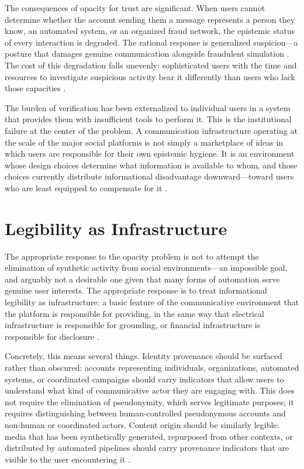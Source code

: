\documentclass[12pt,a4paper]{article}
\begin{document}
The consequences of opacity for trust are significant. When users cannot determine whether the
account sending them a message represents a person they know, an automated system, or an
organized fraud network, the epistemic status of every interaction is degraded. The rational
response is generalized suspicion---a posture that damages genuine communication alongside
fraudulent simulation \citep{boyd2014}. The cost of this degradation falls unevenly:
sophisticated users with the time and resources to investigate suspicious activity bear it
differently than users who lack those capacities \citep{noble2018}.

The burden of verification has been externalized to individual users in a system that provides
them with insufficient tools to perform it. This is the institutional failure at the center of
the problem. A communication infrastructure operating at the scale of the major social platforms
is not simply a marketplace of ideas in which users are responsible for their own epistemic
hygiene. It is an environment whose design choices determine what information is available to
whom, and those choices currently distribute informational disadvantage downward---toward users
who are least equipped to compensate for it \citep{noble2018,zuboff2019}.

\section{Legibility as Infrastructure}

The appropriate response to the opacity problem is not to attempt the elimination of synthetic
activity from social environments---an impossible goal, and arguably not a desirable one given
that many forms of automation serve genuine user interests. The appropriate response is to treat
informational legibility as infrastructure: a basic feature of the communicative environment
that the platform is responsible for providing, in the same way that electrical infrastructure
is responsible for grounding, or financial infrastructure is responsible for disclosure
\citep{gillespie2018,zuboff2019}.

Concretely, this means several things. Identity provenance should be surfaced rather than
obscured: accounts representing individuals, organizations, automated systems, or coordinated
campaigns should carry indicators that allow users to understand what kind of communicative
actor they are engaging with. This does not require the elimination of pseudonymity, which serves
legitimate purposes; it requires distinguishing between human-controlled pseudonymous accounts
and non-human or coordinated actors. Content origin should be similarly legible: media that has
been synthetically generated, repurposed from other contexts, or distributed by automated
pipelines should carry provenance indicators that are visible to the user encountering it
\citep{tufekci2015}.
\end{document}
